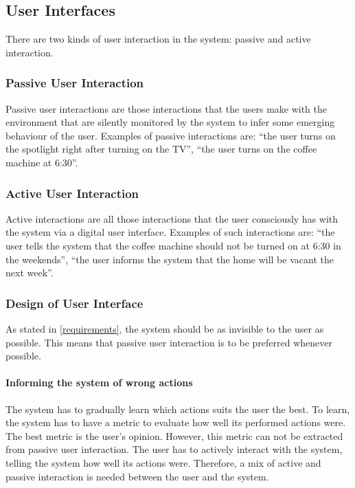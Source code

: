 \subsection{User Interfaces}
There are two kinds of user interaction in the system: passive and active interaction.

\subsubsection{Passive User Interaction}
Passive user interactions are those interactions that the users make with the environment that are silently monitored by the system to infer some emerging behaviour of the user. Examples of passive interactions are: \enquote{the user turns on the spotlight right after turning on the TV}, \enquote{the user turns on the coffee machine at 6:30}.

\subsubsection{Active User Interaction}
Active interactions are all those interactions that the user consciously has with the system via a digital user interface. Examples of such interactions are: \enquote{the user tells the system that the coffee machine should not be turned on at 6:30 in the weekends}, \enquote{the user informs the system that the home will be vacant the next week}.

\subsubsection{Design of User Interface}
As stated in \cref{requirements}, the system should be as invisible to the user as possible. This means that passive user interaction is to be preferred whenever possible. 

\paragraph{Informing the system of wrong actions}

The system has to gradually learn which actions suits the user the best. To learn, the system has to have a metric to evaluate how well its performed actions were. The best metric is the user's opinion. However, this metric can not be extracted from passive user interaction. The user has to actively interact with the system, telling the system how well its actions were. Therefore, a mix of active and passive interaction is needed between the user and the system.

